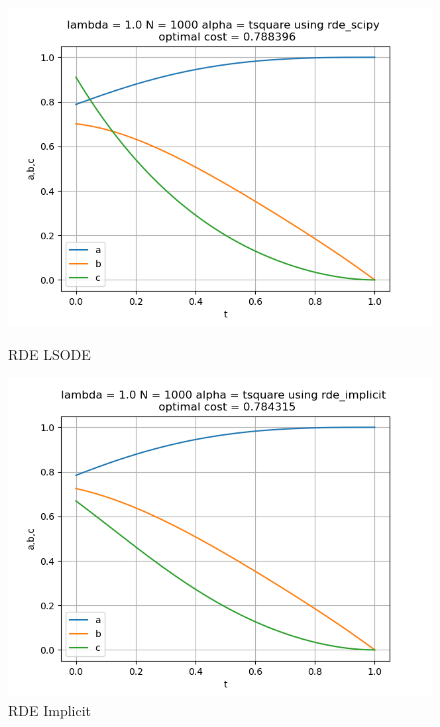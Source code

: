 \begin{figure}[H]
	\centering
	\begin{minipage}{0.3\textwidth}
		\centering
		\includegraphics[width=\linewidth]{rde_scipy_l1_alphat2.png}
		\caption{RDE LSODE}
	\end{minipage}
	\hfill
	\begin{minipage}{0.3\textwidth}
		\centering
		\includegraphics[width=\linewidth]{rde_implicit_l1_alphat2.png}
		\caption{RDE Implicit}
	\end{minipage}
	\hfill
	\begin{minipage}{0.3\textwidth}
		\centering

\end{minipage}
\end{figure}
